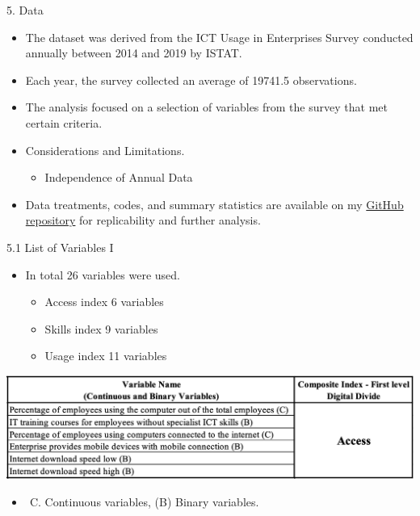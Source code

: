 \documentclass[
  ignorenonframetext,
]{beamer}
\providecommand{\tightlist}{%
  \setlength{\itemsep}{0pt}\setlength{\parskip}{0pt}}
\begin{document}
\begin{frame}{5. Data}
\label{data}
\begin{itemize}
\item
  The dataset was derived from the ICT Usage in Enterprises Survey
  conducted annually between 2014 and 2019 by ISTAT.
\item
  Each year, the survey collected an average of 19741.5 observations.
\item
  The analysis focused on a selection of variables from the survey that
  met certain criteria.
\item
  Considerations and Limitations.

  \begin{itemize}
  \tightlist
  \item
    Independence of Annual Data
  \end{itemize}
\item
  Data treatments, codes, and summary statistics are available on my
  \href{https://github.com/luchocastillo84/Factor_Analysis_Digital_Divide/tree/main}{GitHub
  repository} for replicability and further analysis.
\end{itemize}
\end{frame}

\begin{frame}{5.1 List of Variables I}
\label{list-of-variables-i}
\begin{itemize}
\item
  In total 26 variables were used.

  \begin{itemize}
  \tightlist
  \item
    Access index 6 variables
  \item
    Skills index 9 variables
  \item
    Usage index 11 variables
  \end{itemize}
\end{itemize}

\begin{center} 
\includegraphics[width=1\textwidth]{access_vars.png}
\end{center}

\begin{itemize}
\tightlist
\item
  \begin{enumerate}
  [(A)]
  \setcounter{enumi}{2}
  \tightlist
  \item
    Continuous variables, (B) Binary variables.
  \end{enumerate}
\end{itemize}
\end{frame}
\end{document}
